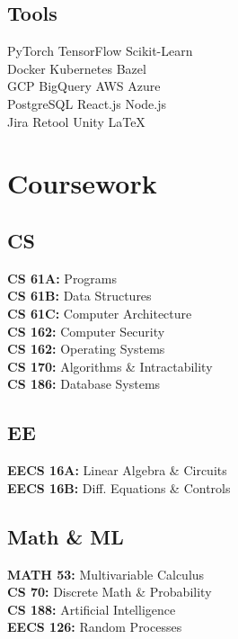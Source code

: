 \documentclass[]{deedy-resume-openfont}
\begin{document}
\begin{minipage}[t]{0.33\textwidth}
\sectionsep
\subsection{Tools}
PyTorch \textbullet{} TensorFlow \textbullet{} Scikit-Learn \textbullet{} \\
Docker \textbullet{} Kubernetes \textbullet{} Bazel \textbullet{} \\
GCP  \textbullet{} BigQuery \textbullet{} AWS  \textbullet{}  Azure \textbullet{} \\
PostgreSQL  \textbullet{}  React.js \textbullet{} Node.js \textbullet{} \\
Jira \textbullet{} Retool \textbullet{} Unity \textbullet{} LaTeX \\

\sectionsep



\section{Coursework}
\subsection{CS}
{\bf CS 61A:} Programs \\
{\bf CS 61B:} Data Structures \\
{\bf CS 61C:} Computer Architecture \\
{\bf CS 162:} Computer Security \\
{\bf CS 162:} Operating Systems \\
{\bf CS 170:} Algorithms \& Intractability \\
{\bf CS 186:} Database Systems \\
\sectionsep

\subsection{EE}
{\bf EECS 16A:} Linear Algebra \& Circuits \\
{\bf EECS 16B:} Diff. Equations \& Controls \\
\sectionsep

\subsection{Math \& ML}
{\bf MATH 53:} Multivariable Calculus \\
{\bf CS 70:} Discrete Math \& Probability \\
{\bf CS 188:} Artificial Intelligence \\
{\bf EECS 126:}  Random Processes \\



\end{minipage}
\end{document}
